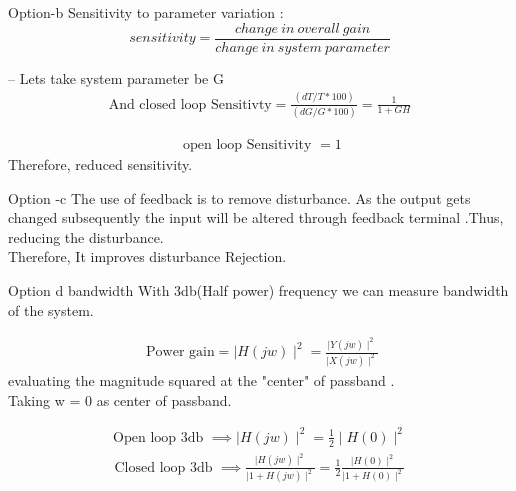 \documentclass{beamer}
\begin{document}
\begin{frame}{Option-b}
Sensitivity to parameter variation :\\



\[     sensitivity 
  = \dfrac{change\ in\ overall\ gain}{change\ in\ system\ parameter}
\]




-- Lets take system parameter be G\\ 
\begin{align}
     \text{And closed loop Sensitivty}  = \frac{(dT/T*100)}{(dG/G*100)}  = \frac{1}{1+GH}
\end{align}

\begin{align}
\text{ open loop Sensitivity }= 1 
\end{align}
Therefore, reduced sensitivity.



\end{frame}

\begin{frame}{Option -c}
    The use of feedback is to remove disturbance. As the output gets changed subsequently the input will be altered through feedback terminal .Thus, reducing the disturbance. \\
    
    Therefore, It improves disturbance Rejection.
\end{frame}{}






\begin{frame}{Option d bandwidth}
With 3db(Half power) frequency we can measure bandwidth of the system.

\begin{align}
   \text{ Power gain} = \mid H(jw) \mid ^2 =  \frac{\mid Y(jw) \mid ^2}{\mid X(jw) \mid ^2 }  
\end{align}
evaluating the magnitude squared at the "center" of  passband .\\
Taking w = 0 as center of passband.

\begin{align}
   \text{Open loop 3db }  \implies \mid H(jw) \mid ^2 =  \frac{1}{2}\mid H(0) \mid ^2
\end{align}
\begin{align}
   \text{Closed loop 3db } \implies \frac{\mid H(jw) \mid ^2}{\mid 1 + H(jw) \mid^2} =  \frac{1}{2}\frac{\mid H(0) \mid ^2}{\mid 1 + H(0) \mid^2}
\end{align}
\end{frame}
\end{document}
